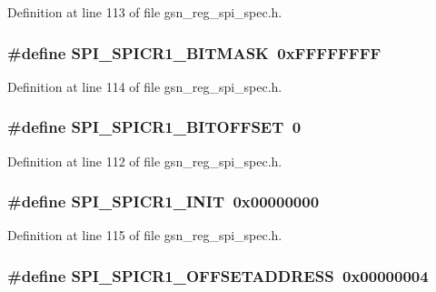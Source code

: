 Definition at line 113 of file gsn\_\-reg\_\-spi\_\-spec.h.

\hypertarget{a00573_a019a124d27363e54242e4e1e62f79898}{
\subsubsection[{SPI\_\-SPICR1\_\-BITMASK}]{\setlength{\rightskip}{0pt plus 5cm}\#define SPI\_\-SPICR1\_\-BITMASK~0xFFFFFFFF}}
\label{a00573_a019a124d27363e54242e4e1e62f79898}


Definition at line 114 of file gsn\_\-reg\_\-spi\_\-spec.h.

\hypertarget{a00573_ab3ea9b0cfed75365cdd9580cf5b1a819}{
\subsubsection[{SPI\_\-SPICR1\_\-BITOFFSET}]{\setlength{\rightskip}{0pt plus 5cm}\#define SPI\_\-SPICR1\_\-BITOFFSET~0}}
\label{a00573_ab3ea9b0cfed75365cdd9580cf5b1a819}


Definition at line 112 of file gsn\_\-reg\_\-spi\_\-spec.h.

\hypertarget{a00573_a79d063e4103aa31c0352e5b7d4d25377}{
\subsubsection[{SPI\_\-SPICR1\_\-INIT}]{\setlength{\rightskip}{0pt plus 5cm}\#define SPI\_\-SPICR1\_\-INIT~0x00000000}}
\label{a00573_a79d063e4103aa31c0352e5b7d4d25377}


Definition at line 115 of file gsn\_\-reg\_\-spi\_\-spec.h.

\hypertarget{a00573_a7c60d3ea4950f6026e1fa45d0541914e}{
\subsubsection[{SPI\_\-SPICR1\_\-OFFSETADDRESS}]{\setlength{\rightskip}{0pt plus 5cm}\#define SPI\_\-SPICR1\_\-OFFSETADDRESS~0x00000004}}
\label{a00573_a7c60d3ea4950f6026e1fa45d0541914e}


